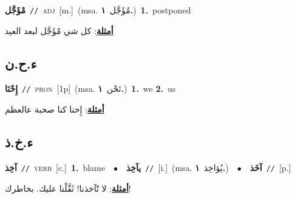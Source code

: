 \documentclass[10pt,a4paper,twoside]{article} %
\begin{document}
\begin{multicols}{2}
{{{{{{\setlength\topsep{0pt}\textbf{\foreignlanguage{arabic}{مْؤَجَّل}}\ {\color{gray}\texttt{//}\color{black}}\ \textsc{adj}\ [m.]\ \color{gray}(msa. \foreignlanguage{arabic}{مُؤَجَّل}~\foreignlanguage{arabic}{\textbf{١.}})\color{black}\ \textbf{1.}~postponed\  \begin{flushright}\color{gray}\foreignlanguage{arabic}{\textbf{\underline{\foreignlanguage{arabic}{أمثلة}}}: كل شي مْؤَجَّل لبعد العيد}\end{flushright}\color{black}} \vspace{2mm}

\vspace{-3mm}
\subsection*{\color{blue}\foreignlanguage{arabic}{ء.ح.ن}\color{blue}{ (ntws)}} 

{\setlength\topsep{0pt}\textbf{\foreignlanguage{arabic}{إِحْنَا}}\ {\color{gray}\texttt{//}\color{black}}\ \textsc{pron}\ [1p]\ \color{gray}(msa. \foreignlanguage{arabic}{نَحْن}~\foreignlanguage{arabic}{\textbf{١.}})\color{black}\ \textbf{1.}~we  \textbf{2.}~us\  \begin{flushright}\color{gray}\foreignlanguage{arabic}{\textbf{\underline{\foreignlanguage{arabic}{أمثلة}}}: إِحنا كنا صحبة عالعظم}\end{flushright}\color{black}} \vspace{2mm}

\vspace{-3mm}
\subsection*{\color{blue}\foreignlanguage{arabic}{ء.خ.ذ}\color{blue}{}} 

{\setlength\topsep{0pt}\textbf{\foreignlanguage{arabic}{آخِذ}}\ {\color{gray}\texttt{//}\color{black}}\ \textsc{verb}\ [c.]\ \textbf{1.}~blame\ \ $\bullet$\ \ \setlength\topsep{0pt}\textbf{\foreignlanguage{arabic}{يآخِذ}}\ {\color{gray}\texttt{//}\color{black}}\ [i.]\ \color{gray}(msa. \foreignlanguage{arabic}{يُؤاخِذ}~\foreignlanguage{arabic}{\textbf{١.}})\color{black}\ \ $\bullet$\ \ \setlength\topsep{0pt}\textbf{\foreignlanguage{arabic}{آخَذ}}\ {\color{gray}\texttt{//}\color{black}}\ [p.]\  \begin{flushright}\color{gray}\foreignlanguage{arabic}{\textbf{\underline{\foreignlanguage{arabic}{أمثلة}}}: لا تْآخذنا! ثَقَّلْنا عليك. بخاطرك!}\end{flushright}\color{black}} \vspace{2mm}

}}}}}
\end{multicols}
\end{document}
